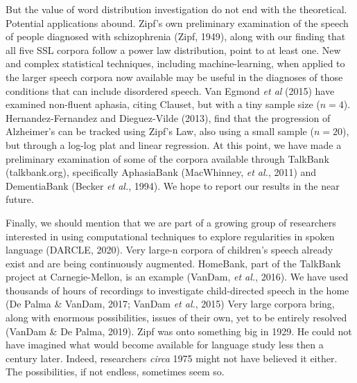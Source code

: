 \documentclass[12pt]{article}
\begin{document}
But the value of word distribution investigation do not end with the theoretical.  Potential applications abound.  Zipf's own preliminary examination of the speech of people diagnosed with schizophrenia (Zipf, 1949), along with our finding that all five SSL corpora follow a power law distribution, point to at least one. New and complex statistical techniques, including machine-learning, when applied to the larger speech corpora now available may be useful in the diagnoses of those conditions that can include disordered speech.  Van Egmond \emph{et al} (2015) have examined non-fluent aphasia, citing Clauset, but with a tiny sample size ($n = 4$).  Hernandez-Fernandez and Dieguez-Vilde (2013), find that the progression of Alzheimer's can be tracked using Zipf's Law, also using a small sample ($n = 20$), but through a log-log plat and linear regression.  At this point, we have made a preliminary examination of some of the corpora available through TalkBank (talkbank.org), specifically AphasiaBank (MacWhinney, \emph{et al.}, 2011) and DementiaBank (Becker \emph{et al.}, 1994). We hope to report our results in the near future.

Finally, we should mention that we are part of a growing group of researchers interested in using computational techniques to explore regularities in spoken language (DARCLE, 2020).  Very large-n corpora of children's speech already exist and are being continuously augmented.  HomeBank, part of the TalkBank project at Carnegie-Mellon, is an example (VanDam, \emph{et al.}, 2016). We have used thousands of hours of recordings to investigate child-directed speech in the home (De Palma \& VanDam, 2017; VanDam \emph{et al.}, 2015)  Very large corpora bring, along with enormous possibilities, issues of their own, yet to be entirely resolved (VanDam \& De Palma, 2019).  Zipf was onto something big in 1929. He could not have imagined what would become available for language study less then a century later.  Indeed, researchers \emph{circa} 1975 might not have believed it either.  The possibilities, if not endless, sometimes seem so.    
\end{document}
